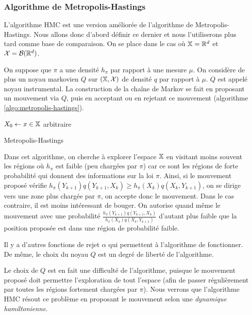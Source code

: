 \documentclass[10pt,a4paper]{article}
\begin{document}
\subsubsection{Algorithme de Metropolis-Hastings}

L'algorithme HMC est une version améliorée de l'algorithme de Metropolis-Hastings. Nous allons donc d'abord définir ce dernier et nous l'utiliserons plus tard comme base de comparaison. On se place dans le cas où $\mathbb{X} = \mathbb{R}^d$ et $\mathcal{X} = \mathcal{B}(\mathbb{R}^d)$. 

On suppose que $\pi$ a une densité $h_\pi$ par rapport à une mesure $\mu$. On considère de plus un noyau markovien $Q$ sur $(\mathbb{X}, \mathcal{X})$ de densité $q$ par rapport à $\mu$. $Q$ est appelé noyau instrumental. La construction de la chaîne de Markov se fait en proposant un mouvement via $Q$, puis en acceptant ou en rejetant ce mouvement (algorithme \ref{algo:metropolis-hastings}).

\begin{center}
\begin{algorithm}[H]
  $X_0 \leftarrow x \in \mathbb{X}$ arbitraire\;
  \caption{Metropolis-Hastings}
  \label{algo:metropolis-hastings}
\end{algorithm}
\end{center}

Dans cet algorithme, on cherche à explorer l'espace $\mathbb{X}$ en visitant moins souvent les régions où $h_\pi$ est faible (peu chargées par $\pi$) car ce sont les régions de forte probabilité qui donnent des informations sur la loi $\pi$. Ainsi, si le mouvement proposé vérifie $h_\pi(Y_{k+1})q(Y_{k+1}, X_k) \geq h_\pi(X_k) q(X_k, Y_{k+1})$, on se dirige vers une zone plus chargée par $\pi$, on accepte donc le mouvement. Dans le cas contraire, il est moins intéressant de bouger. On autorise quand même le mouvement avec une probabilité $\frac{h_\pi(Y_{k+1})q(Y_{k+1},X_k)}{h_\pi(X_k)q(X_k,Y_{k+1})}$ d'autant plus faible que la position proposée est dans une région de probabilité faible.

\begin{Rque}
  Il y a d'autres fonctions de rejet $\alpha$ qui permettent à l'algorithme de fonctionner. De même, le choix du noyau $Q$ est un degré de liberté de l'algorithme.

  Le choix de $Q$ est en fait une difficulté de l'algorithme, puisque le mouvement proposé doit permettre l'exploration de tout l'espace (afin de passer régulièrement par toutes les régions fortement chargées par $\pi$). Nous verrons que l'algorithme HMC résout ce problème en proposant le mouvement selon une \emph{dynamique hamiltonienne}.
\end{Rque}
\end{document}
